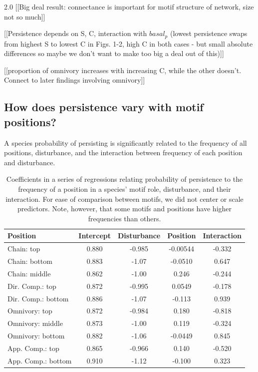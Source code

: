 \documentclass[12pt]{article}
\begin{document}
\begin{spacing}{2.0}
    [[Big deal result: connectance is important for motif structure of network, size not so much]]
    

    [[Persistence depends on S, C, interaction with $basal_p$ (lowest persistence swaps from highest S to lowest C in Figs. 1-2, high C in both cases - but small absolute differences so maybe we don't want to make too big a deal out of this)]]
    
    [[proportion of omnivory increases with increasing C, while the other doesn't. Connect to later findings involving omnivory]]



\clearpage

    \subsection*{How does persistence vary with motif positions?}

        A species probability of persisting is significantly related to the frequency of all positions, disturbance, and the interaction between frequency of each position and disturbance.
        \begin{table}[h!]
            \caption{Coefficients in a series of regressions relating probability of persistence to the frequency of a position in a species' motif role, disturbance, and their interaction. For ease of comparison between motifs, we did not center or scale predictors. Note, however, that some motifs and positions have higher frequencies than others.}
            \label{tab:persistence_vs_positions}
            \centering
            \begin{tabular}{l | c c c c}
            Position	& Intercept	& Disturbance	& Position	& Interaction \\
            \hline
            Chain: top	& 0.880 &	-0.985 & -0.00544 & -0.332 \\
            Chain: bottom	& 0.883 &	-1.07 &	-0.0510 &	0.647 \\
            Chain: middle	& 0.862 & -1.00 &	0.246 &	-0.244 \\
            \hline
            Dir. Comp.: top & 0.872 &	-0.995	& 0.0549 &	-0.178 \\
            Dir. Comp.: bottom & 0.886 &	-1.07 &	-0.113 &	0.939 \\
            \hline
            Omnivory: top	& 0.872 &	-0.984 &	0.180 &	-0.818 \\
            Omnivory: middle & 0.873 & -1.00 &	0.119 &	-0.324 \\
            Omnivory: bottom & 0.882 & -1.06 &	-0.0449 &	0.845 \\
            \hline
            App. Comp.: top & 0.865 &	-0.966 &	0.140 &	-0.520 \\
            App. Comp.: bottom & 0.910 &	-1.12 &	-0.100 &	0.323 \\
            \hline
            \end{tabular}
        \end{table}
        

\end{spacing}
\end{document}
